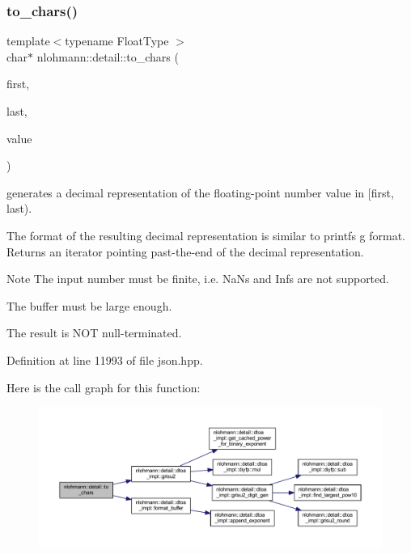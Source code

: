 \subsubsection{\texorpdfstring{to\_chars()}{to\_chars()}}
{\footnotesize\ttfamily template$<$typename Float\+Type $>$ \\
char$\ast$ nlohmann\+::detail\+::to\+\_\+chars (\begin{DoxyParamCaption}\item[{char $\ast$}]{first,  }\item[{const char $\ast$}]{last,  }\item[{Float\+Type}]{value }\end{DoxyParamCaption})}



generates a decimal representation of the floating-\/point number value in \mbox{[}first, last). 

The format of the resulting decimal representation is similar to printf\textquotesingle{}s g format. Returns an iterator pointing past-\/the-\/end of the decimal representation.

\begin{DoxyNote}{Note}
The input number must be finite, i.\+e. NaN\textquotesingle{}s and Inf\textquotesingle{}s are not supported. 

The buffer must be large enough. 

The result is N\+OT null-\/terminated. 
\end{DoxyNote}


Definition at line 11993 of file json.\+hpp.

Here is the call graph for this function\+:
\nopagebreak
\begin{figure}[H]
\begin{center}
\leavevmode
\includegraphics[width=350pt]{namespacenlohmann_1_1detail_a18759c536d89c4dd3a118bd3ecb790da_cgraph}
\end{center}
\end{figure}
\mbox{\label{namespacenlohmann_1_1detail_a1a804b98cbe89b7e44b698f2ca860490}} 
